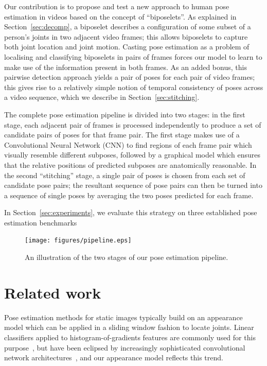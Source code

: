 \documentclass[runningheads]{llncs}
\begin{document}
Our contribution is to propose and test a new approach to human pose estimation
in videos based on the concept of ``biposelets''. As explained in
Section~\ref{sec:decomp}, a biposelet describes a configuration of some subset
of a person's joints in two adjacent video frames; this allows biposelets to
capture both joint location and joint motion. Casting pose estimation as a
problem of localising and classifying biposelets in pairs of frames forces our
model to learn to make use of the information present in both frames.
As an added bonus, this pairwise detection approach yields a pair of poses for
each pair of video frames; this gives rise to a relatively simple notion of
temporal consistency of poses across a video sequence, which we describe in
Section~\ref{sec:stitching}.

The complete pose estimation pipeline is divided into two stages: in the first
stage, each adjacent pair of frames is processed independently to produce a set
of candidate pairs of poses for that frame pair. The first stage makes use of a
Convolutional Neural Network (CNN) to find regions of each frame pair which
visually resemble different subposes, followed by a graphical model which
ensures that the relative positions of predicted subposes are anatomically
reasonable. In the second ``stitching'' stage, a single pair of poses is chosen
from each set of candidate pose pairs; the resultant sequence of pose pairs can
then be turned into a sequence of single poses by averaging the two poses
predicted for each frame.

In Section~\ref{sec:experiments}, we evaluate this strategy on three
established pose estimation benchmarks %

\begin{figure}[t]
\begin{center}
\texttt{[image: figures/pipeline.eps]}
\end{center}
\vspace{-5mm}
\caption{An illustration of the two stages of our pose estimation pipeline.}
\label{fig:pipeline}
\end{figure}

\section{Related work}\label{sec:related-work}

Pose estimation methods for static images typically build on an appearance model
which can be applied in a sliding window fashion to locate joints. Linear
classifiers applied to histogram-of-gradients features are commonly used for
this purpose~\cite{yang2011articulated,cherian2014mixing}, but have been
eclipsed by increasingly sophisticated convolutional network
architectures~\cite{jain2014modeep,tompson2014joint,chen2014articulated,pfister2015flowing,wei2016convolutional},
and our appearance model reflects this trend.
\end{document}
